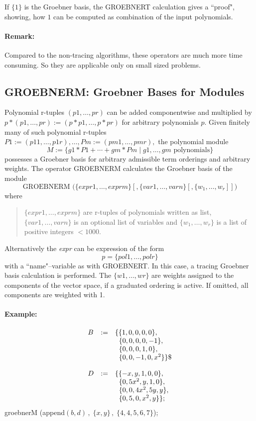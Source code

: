 If $\{1\}$ is the Groebner basis, the GROEBNERT calculation gives
a ``proof", showing,  how  $1$ can be computed as combination of the
input polynomials.

\paragraph{Remark:} Compared to the non-tracing algorithms, these
operators are much more time consuming. So they are applicable
only on small sized problems.

\subsection{GROEBNERM: Groebner Bases for Modules}

Polynomial r-tuples
 $(p1,\ldots,pr) $ can be added componentwise
and multiplied by $ p*(p1,\ldots,pr) := (p*p1,\ldots,p*pr) $
for arbitrary polynomials $p.$  Given finitely many of
such polynomial r-tuples $P1:=(p11,\ldots,p1r),\ldots,Pm:=(pm1,\ldots,pmr),$
the polynomial module
\[ M := \{ g1*P1 + \cdots + gm*Pm \mid g1,\ldots,gm \mbox{ polynomials} \}
\]
possesses a Groebner basis for arbitrary admissible term orderings and
arbitrary weights.
The operator GROEBNERM calculates the Groebner basis of the module
\[
\mbox{GROEBNERM } \bigl(\{expr1, \ldots , exprm\} [,\{var1, \ldots ,
varn\} [, \{w_1, \ldots , w_r] ] \bigr)
\]
where
\begin{quote}
$\{expr1, \ldots , exprm\}$  are r-tuples of polynomials written as list,
\linebreak[4]$\{var1, \ldots , varn\}$ is an optional list of variables and
$\{w_1, \ldots , w_r\}$ is a list of positive integers $<1000$.
\end{quote}
Alternatively the {\it expr} can be expression of the form
\[
p= \{pol1, \ldots , polr\}
\]
with a ``name"--variable as with GROEBNERT. In this case, a tracing
Groebner basis calculation is performed. The $\{w1, \ldots , wr\}$ are
weights assigned to the components of the vector space, if a graduated
ordering is active. If omitted, all components are weighted with 1.
\paragraph{Example:}
\[
\begin{array}{lll}
B & := & \{\{  1 ,  0  ,  0  ,  0  ,  0 \}, \\
& & \;\;\{  0 ,  0  ,  0  ,  0  , -1\}, \\
& & \;\;\{  0 ,  0  ,  0  ,  1  ,  0\}, \\
& & \;\;\{  0 ,  0  , -1  ,  0  , x^2\}\}\$ \vspace*{4mm} \\
D & := & \{\{ -x ,  y  ,  1  ,  0  ,  0 \}, \\
& &\;\;\{  0 ,5x^2 ,  y  ,  1  ,  0 \}, \\
& &\;\;\{  0 ,  0  ,4x^2 , 5y  , y\}, \\
& &\;\;\{  0 ,  5  ,  0  , x^2 ,  y \}\};
\end{array}
\]
groebnerM (append$(b,d)\, ,\;\{x,y\}\,, \;\{4,4,5,6,7\}$);

